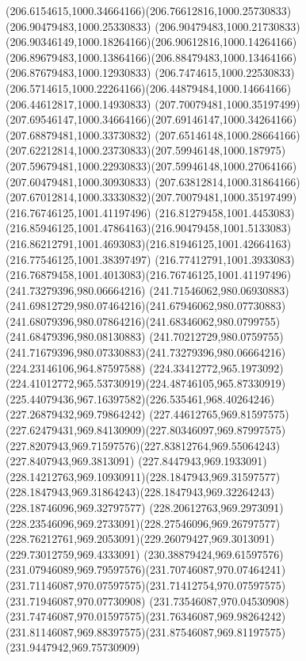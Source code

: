 {    \curveto(206.6154615,1000.34664166)(206.76612816,1000.25730833)(206.90479483,1000.25330833)
    \curveto(206.90479483,1000.21730833)(206.90346149,1000.18264166)(206.90612816,1000.14264166)
    \curveto(206.89679483,1000.13864166)(206.88479483,1000.13464166)(206.87679483,1000.12930833)
    \curveto(206.7474615,1000.22530833)(206.5714615,1000.22264166)(206.44879484,1000.14664166)
    \lineto(206.44612817,1000.14930833)
    \moveto(207.70079481,1000.35197499)
    \curveto(207.69546147,1000.34664166)(207.69146147,1000.34264166)(207.68879481,1000.33730832)
    \curveto(207.65146148,1000.28664166)(207.62212814,1000.23730833)(207.59946148,1000.187975)
    \curveto(207.59679481,1000.22930833)(207.59946148,1000.27064166)(207.60479481,1000.30930833)
    \curveto(207.63812814,1000.31864166)(207.67012814,1000.33330832)(207.70079481,1000.35197499)
    \moveto(216.76746125,1001.41197496)
    \curveto(216.81279458,1001.4453083)(216.85946125,1001.47864163)(216.90479458,1001.5133083)
    \curveto(216.86212791,1001.4693083)(216.81946125,1001.42664163)(216.77546125,1001.38397497)
    \curveto(216.77412791,1001.3933083)(216.76879458,1001.4013083)(216.76746125,1001.41197496)
    \moveto(241.73279396,980.06664216)
    \curveto(241.71546062,980.06930883)(241.69812729,980.07464216)(241.67946062,980.07730883)
    \curveto(241.68079396,980.07864216)(241.68346062,980.0799755)(241.68479396,980.08130883)
    \curveto(241.70212729,980.0759755)(241.71679396,980.07330883)(241.73279396,980.06664216)
    \moveto(224.23146106,964.87597588)
    \curveto(224.33412772,965.1973092)(224.41012772,965.53730919)(224.48746105,965.87330919)
    \curveto(225.44079436,967.16397582)(226.535461,968.40264246)(227.26879432,969.79864242)
    \curveto(227.44612765,969.81597575)(227.62479431,969.84130909)(227.80346097,969.87997575)
    \curveto(227.8207943,969.71597576)(227.83812764,969.55064243)(227.8407943,969.3813091)
    \curveto(227.8447943,969.1933091)(228.14212763,969.10930911)(228.1847943,969.31597577)
    \curveto(228.1847943,969.31864243)(228.1847943,969.32264243)(228.18746096,969.32797577)
    \curveto(228.20612763,969.2973091)(228.23546096,969.2733091)(228.27546096,969.26797577)
    \curveto(228.76212761,969.2053091)(229.26079427,969.3013091)(229.73012759,969.4333091)
    \curveto(230.38879424,969.61597576)(231.07946089,969.79597576)(231.70746087,970.07464241)
    \curveto(231.71146087,970.07597575)(231.71412754,970.07597575)(231.71946087,970.07730908)
    \curveto(231.73546087,970.04530908)(231.74746087,970.01597575)(231.76346087,969.98264242)
    \curveto(231.81146087,969.88397575)(231.87546087,969.81197575)(231.9447942,969.75730909)
}
